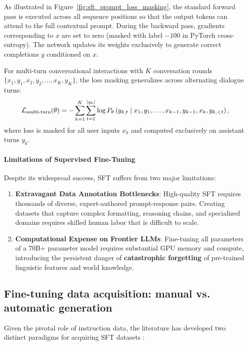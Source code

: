 \documentclass[../../main.tex]{subfiles}
\begin{document}
As illustrated in Figure~\ref{fig:sft_prompt_loss_masking}, the standard forward pass is executed across all sequence positions so that the output tokens can attend to the full contextual prompt. During the backward pass, gradients corresponding to $x$ are set to zero (masked with label $-100$ in PyTorch cross-entropy). The network updates its weights exclusively to generate correct completions $y$ conditioned on $x$.

For multi-turn conversational interactions with $K$ conversation rounds $\{x_1, y_1, x_2, y_2, \dots, x_K, y_K\}$, the loss masking generalizes across alternating dialogue turns:
\begin{equation}
\label{eq:multiturn_sft_loss}
\mathcal{L}_{\text{multi-turn}}(\theta) = -\sum_{k=1}^K \sum_{t=1}^{|y_k|} \log P_\theta\left(y_{k, t} \;\middle|\; x_1, y_1, \dots, x_{k-1}, y_{k-1}, x_k, y_{k, <t}\right),
\end{equation}
where loss is masked for all user inputs $x_k$ and computed exclusively on assistant turns $y_k$.

\paragraph{Limitations of Supervised Fine-Tuning}
Despite its widespread success, SFT suffers from two major limitations:
\begin{enumerate}
    \item \textbf{Extravagant Data Annotation Bottlenecks}: High-quality SFT requires thousands of diverse, expert-authored prompt-response pairs. Creating datasets that capture complex formatting, reasoning chains, and specialized domains requires skilled human labor that is difficult to scale.
    \item \textbf{Computational Expense on Frontier LLMs}: Fine-tuning all parameters of a 70B+ parameter model requires substantial GPU memory and compute, introducing the persistent danger of \textbf{catastrophic forgetting} of pre-trained linguistic features and world knowledge.
\end{enumerate}

\subsection{Fine-tuning data acquisition: manual vs. automatic generation}
\label{subsec:sft_data_acquisition_taxonomy}

Given the pivotal role of instruction data, the literature has developed two distinct paradigms for acquiring SFT datasets \citep{xiao2025}:
\end{document}
